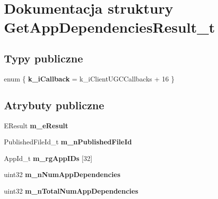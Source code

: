 \hypertarget{struct_get_app_dependencies_result__t}{}\section{Dokumentacja struktury Get\+App\+Dependencies\+Result\+\_\+t}
\label{struct_get_app_dependencies_result__t}
\subsection*{Typy publiczne}
\begin{DoxyCompactItemize}
\item 
\mbox{\label{struct_get_app_dependencies_result__t_aa8035412f987b4afe2a75c0f6d08e557}} 
enum \{ {\bfseries k\+\_\+i\+Callback} = k\+\_\+i\+Client\+U\+G\+C\+Callbacks + 16
 \}
\end{DoxyCompactItemize}
\subsection*{Atrybuty publiczne}
\begin{DoxyCompactItemize}
\item 
\mbox{\label{struct_get_app_dependencies_result__t_a3adf8046d897650c65cd85120586e757}} 
E\+Result {\bfseries m\+\_\+e\+Result}
\item 
\mbox{\label{struct_get_app_dependencies_result__t_a0fb153e24dd4f663a77b5ad0ee4da24f}} 
Published\+File\+Id\+\_\+t {\bfseries m\+\_\+n\+Published\+File\+Id}
\item 
\mbox{\label{struct_get_app_dependencies_result__t_a3a7adac160d8e25702c7e0d8aed68d06}} 
App\+Id\+\_\+t {\bfseries m\+\_\+rg\+App\+I\+Ds} \mbox{[}32\mbox{]}
\item 
\mbox{\label{struct_get_app_dependencies_result__t_a2a05acb8282e157f18b6517e3d2a0fc2}} 
uint32 {\bfseries m\+\_\+n\+Num\+App\+Dependencies}
\item 
\mbox{\label{struct_get_app_dependencies_result__t_a7c7d618972473237a83c2b2c73edf261}} 
uint32 {\bfseries m\+\_\+n\+Total\+Num\+App\+Dependencies}
\end{DoxyCompactItemize}


